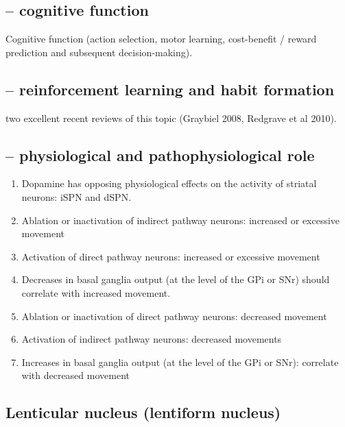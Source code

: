 \subsection{-- cognitive function }

Cognitive function (action selection, motor learning, cost-benefit / reward
prediction and subsequent decision-making).


\subsection{-- reinforcement learning and habit formation}

two excellent recent reviews of this topic (Graybiel 2008, Redgrave et al 2010).



\subsection{-- physiological and pathophysiological role}

\begin{enumerate}
  \item  Dopamine has opposing physiological effects on the activity of striatal
  neurons: iSPN and dSPN.

  \item Ablation or inactivation of indirect pathway neurons: increased or
  excessive movement
  
  \item Activation of direct pathway neurons: increased or excessive movement
  
  \item Decreases in basal ganglia output (at the level of the GPi or SNr)
  should correlate with increased movement.
  
  \item Ablation or inactivation of direct pathway neurons: decreased movement
  
  \item Activation of indirect pathway neurons: decreased movements
  
  \item Increases in basal ganglia output (at the level of the GPi or
  SNr): correlate with decreased movement
\end{enumerate}


\subsection{Lenticular nucleus (lentiform nucleus)}
\label{sec:lenticular_nucleus}
\label{sec:lentiform_nucleus}

